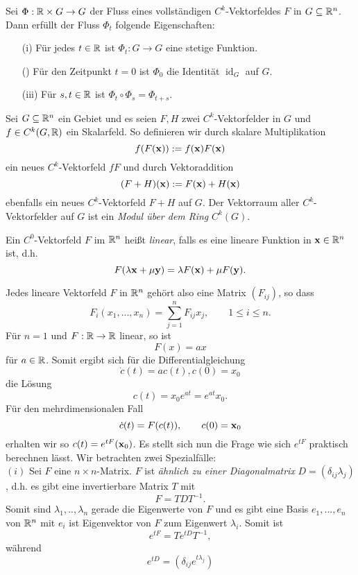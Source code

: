 \documentclass[
pdftex,
oneside,
headsepline,
11pt, 
]{scrreprt}
\begin{document}
\begin{lem}
	Sei $\Phi:\mathbb{R}\times G\to G$ der Fluss eines vollständigen $C^k$-Vektorfeldes $F$ in $G\subseteq \mathbb{R}^n$. Dann erfüllt der Fluss $\Phi_t$ folgende Eigenschaften:
	\begin{itemize}
		\item[(i)] Für jedes $t\in \mathbb{R}$ ist $\Phi_t:G\to G$ eine stetige Funktion.
		\item[()] Für den Zeitpunkt  $t=0$ ist $\Phi_0$ die Identität $\operatorname{id}_G$ auf $G$.
		\item[(iii)] Für $s,t\in \mathbb{R}$ ist $\Phi_t\circ\Phi_s=\Phi_{t+s}$.
	\end{itemize}
\end{lem}
\begin{de}
	Sei $G\subseteq \mathbb{R}^n$ ein Gebiet und es seien  $F,H$ zwei $C^k$-Vektorfelder in $G$ und $f\in C^k(G,\mathbb{R})$ ein Skalarfeld. So definieren wir durch skalare Multiplikation \[ f(F(\textnormal{\textbf{x}})):=f(\textnormal{\textbf{x}})F(\textnormal{\textbf{x}})\] ein neues $C^k$-Vektorfeld $fF$ und durch Vektoraddition \[(F+H)(\textnormal{\textbf{x}}):=F(\textnormal{\textbf{x}})+H(\textnormal{\textbf{x}})\] ebenfalls ein neues $C^k$-Vektorfeld $F+H$ auf $G$. Der Vektorraum aller $C^k$-Vektorfelder auf $G$ ist ein \textit{Modul über dem Ring} $C^k(G)$.
\end{de}
\begin{de}
Ein $C^0$-Vektorfeld $F$ im $\mathbb{R}^n$ heißt \textit{linear}, falls es eine lineare Funktion in $\textnormal{\textbf{x}}\in \mathbb{R}^n$ ist, d.h. \[ F(\lambda \textnormal{\textbf{x}}+\mu \textnormal{\textbf{y}})=\lambda F(\textnormal{\textbf{x}})+\mu F(\textnormal{\textbf{y}}). \] 
\end{de}
Jedes lineare Vektorfeld $F$ in $\mathbb{R}^n$ gehört also eine Matrix $(F_{ij})$, so dass \[ F_i(x_1,...,x_n)=\sum_{j=1}^{n}F_{ij}x_j,\qquad 1\leq i\leq n. \] Für $n=1$ und $F:\mathbb{R}\to \mathbb{R}$ linear, so ist \[F(x)=ax\] für $a\in \mathbb{R}$. Somit ergibt sich für die Differentialgleichung \[ \dot{c}(t)=ac(t), c(0)=x_0 \] die Lösung \[c(t)=x_0e^{at}=e^{at}x_0. \] Für den mehrdimensionalen Fall \[\dot{c}(t)=F(c(t)),\qquad c(0)=\textnormal{\textbf{x}}_0 \] erhalten wir so $c(t)=e^{tF}(\textnormal{\textbf{x}}_0)$. Es stellt sich nun die Frage wie sich $e^{tF}$ praktisch berechnen lässt.
Wir betrachten zwei Spezialfälle:\\
$(i)$ Sei $F$ eine $n\times n$-Matrix. $F$ ist \textit{ähnlich zu einer Diagonalmatrix} $D=(\delta_{ij}\lambda_j)$, d.h. es gibt eine invertierbare Matrix $T$ mit \[F=TDT^{-1}.\] Somit sind $\lambda_1,..,\lambda_n$ gerade die Eigenwerte von $F$ und es gibt eine Basis $e_1,...,e_n$ von $\mathbb{R}^n$ mit $e_i$ ist Eigenvektor von $F$ zum Eigenwert $\lambda_i$. Somit ist \[e^{tF}=Te^{tD}T^{-1},\] während \[ e^{tD}=(\delta_{ij}e^{t\lambda_j}) \]
\end{document}
